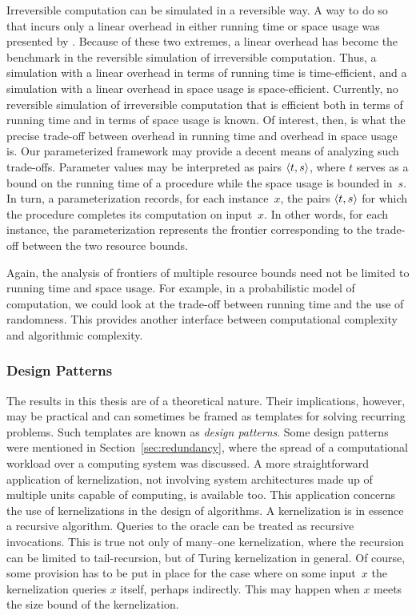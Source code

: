 Irreversible computation can be simulated in a reversible way.
A way to do so that incurs only a linear overhead in either running time or space usage was presented by \textcite{buhrman2001time}.
Because of these two extremes, a linear overhead has become the benchmark in the reversible simulation of irreversible computation.
Thus, a simulation with a linear overhead in terms of running time is time-efficient, and a simulation with a linear overhead in space usage is space-efficient.
Currently, no reversible simulation of irreversible computation that is efficient both in terms of running time and in terms of space usage is known.
Of interest, then, is what the precise trade-off between overhead in running time and overhead in space usage is.
Our parameterized framework may provide a decent means of analyzing such trade-offs.
Parameter values may be interpreted as pairs ${\langle t, s\rangle}$, where $t$ serves as a bound on the running time of a procedure while the space usage is bounded in~$s$.
In turn, a parameterization records, for each instance~$x$, the pairs ${\langle t, s\rangle}$ for which the procedure completes its computation on input~$x$.
In other words, for each instance, the parameterization represents the frontier corresponding to the trade-off between the two resource bounds.

Again, the analysis of frontiers of multiple resource bounds need not be limited to running time and space usage.
For example, in a probabilistic model of computation, we could look at the trade-off between running time and the use of randomness.
This provides another interface between computational complexity and algorithmic complexity.

\subsubsection{Design Patterns}
The results in this thesis are of a theoretical nature.
Their implications, however, may be practical and can sometimes be framed as templates for solving recurring problems.
Such templates are known as \emph{design patterns}.
Some design patterns were mentioned in Section~\ref{sec:redundancy}, where the spread of a computational workload over a computing system was discussed.
A more straightforward application of kernelization, not involving system architectures made up of multiple units capable of computing, is available too.
This application concerns the use of kernelizations in the design of algorithms.
A kernelization is in essence a recursive algorithm.
Queries to the oracle can be treated as recursive invocations.
This is true not only of many--one kernelization, where the recursion can be limited to tail-recursion, but of Turing kernelization in general.
Of course, some provision has to be put in place for the case where on some input~$x$ the kernelization queries $x$ itself, perhaps indirectly.
This may happen when $x$ meets the size bound of the kernelization.

